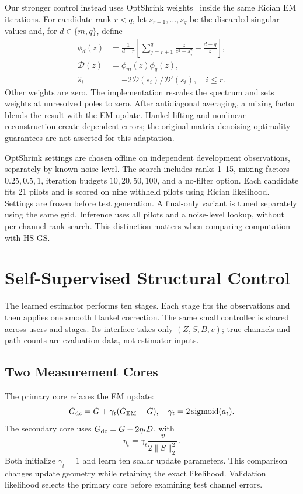 \documentclass[10pt,journal,letterpaper]{IEEEtran}
\DeclareMathOperator{\sigmoid}{sigmoid}
\begin{document}
Our stronger control instead uses OptShrink weights~\cite{nadakuditi2014} inside the same Rician EM iterations. For candidate rank $r<q$, let $s_{r+1},\ldots,s_q$ be the discarded singular values and, for $d\in\{m,q\}$, define
\begin{align}
 \phi_d(z)&=\frac{1}{d-r}\left[\sum_{j=r+1}^{q}\frac{z}{z^2-s_j^2}+\frac{d-q}{z}\right],\\
 \mathcal D(z)&=\phi_m(z)\phi_q(z),\nonumber\\
 \widehat s_i&=-2\mathcal D(s_i)/\mathcal D'(s_i),\quad i\le r.
\end{align}
Other weights are zero. The implementation rescales the spectrum and sets weights at unresolved poles to zero. After antidiagonal averaging, a mixing factor blends the result with the EM update. Hankel lifting and nonlinear reconstruction create dependent errors; the original matrix-denoising optimality guarantees are not asserted for this adaptation.

OptShrink settings are chosen offline on independent development observations, separately by known noise level. The search includes ranks 1--15, mixing factors $0.25,0.5,1$, iteration budgets $10,20,50,100$, and a no-filter option. Each candidate fits 21 pilots and is scored on nine withheld pilots using Rician likelihood. Settings are frozen before test generation. A final-only variant is tuned separately using the same grid. Inference uses all pilots and a noise-level lookup, without per-channel rank search. This distinction matters when comparing computation with HS-GS.

\section{Self-Supervised Structural Control}
\label{sec:learned}
The learned estimator performs ten stages. Each stage fits the observations and then applies one smooth Hankel correction. The same small controller is shared across users and stages. Its interface takes only $(Z,S,B,v)$; true channels and path counts are evaluation data, not estimator inputs.

\subsection{Two Measurement Cores}
The primary core relaxes the EM update:
\begin{equation}
 G_{\rm dc}=G+\gamma_t(G_{\rm EM}-G),\quad
 \gamma_t=2\sigmoid(a_t).
\end{equation}
The secondary core uses $G_{\rm dc}=G-2\eta_tD$, with
\begin{equation}
 \eta_t=\gamma_t\frac{v}{2\|S\|_2^2}.
\end{equation}
Both initialize $\gamma_t=1$ and learn ten scalar update parameters. This comparison changes update geometry while retaining the exact likelihood. Validation likelihood selects the primary core before examining test channel errors.
\end{document}
